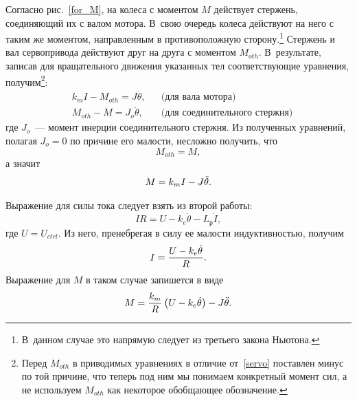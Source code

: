 \documentclass[12pt,a4paper,openany]{extarticle}
\begin{document}
Согласно рис.~\ref{for_M}, на колеса с моментом $M$ действует стержень, соединяющий их с валом мотора.
В~свою очередь колеса действуют на него с таким же моментом, направленным в противоположную сторону\lefteqn.\footnote{В~данном случае это напрямую следует из третьего закона Ньютона.}
Стержень и вал сервопривода действуют друг на друга с моментом $M_{oth}$.
В~результате, записав для вращательного движения указанных тел соответствующие уравнения, получим\footnote{Перед $M_{oth}$ в приводимых уравнениях в отличие от~\eqref{servo} поставлен минус по той причине, что теперь под ним мы понимаем конкретный момент сил, а не используем $M_{oth}$ как некоторое обобщающее обозначение.}:
\begin{align}
	&k_mI - M_{oth} = J\ddot\theta, &&\text{(для вала мотора)}\\
	&M_{oth} - M = J_{o}\ddot\theta, &&\text{(для соединительного стержня)}	
\end{align}
где $J_{o}$~--- момент инерции соединительного стержня.
Из полученных уравнений, полагая $J_o = 0$ по причине его малости, несложно получить, что 
\begin{equation}
	M_{oth} = M,
\end{equation}
а значит
\begin{equation}
	M = k_mI-J\ddot\theta\ldotp
\end{equation}

Выражение для силы тока следует взять из второй работы:
\begin{equation}
	IR = U - k_e\dot\theta - L_\textit{р}\dot{I},
\end{equation}
где $U = U_{ctrl}$.
Из него, пренебрегая в силу ее малости индуктивностью, получим
\begin{equation}
	I = \frac{U-k_e\dot\theta}{R}\ldotp
\end{equation}
Выражение для $M$ в таком случае запишется в виде
\begin{equation}\label{ftr}
	M = \frac{k_m}{R}\left(U-k_e\dot\theta\right) - J\ddot\theta\ldotp
\end{equation}
\end{document}
